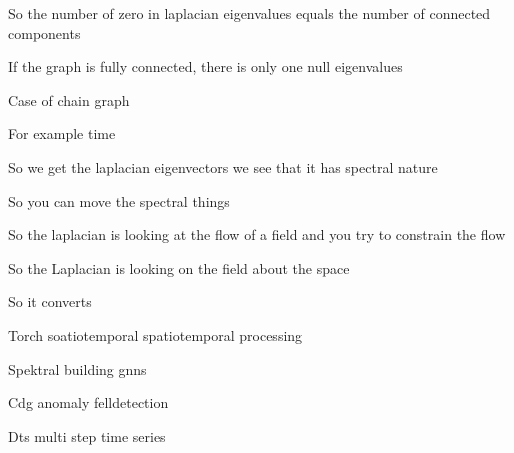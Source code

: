 \documentclass{article}
\begin{document}
So the number of zero in laplacian eigenvalues equals the number of  connected components

If the graph is fully connected, there is only one null eigenvalues

Case of chain graph

For example time

So we get the laplacian eigenvectors we see that it has spectral nature 

So you can move the spectral things

So the laplacian is looking at the flow of a field and you try to constrain the flow 

So the Laplacian is looking on the field about the space 

So it converts 

Torch soatiotemporal spatiotemporal processing

Spektral building gnns 

Cdg  anomaly felldetection 

Dts multi step time series 






\end{document}
